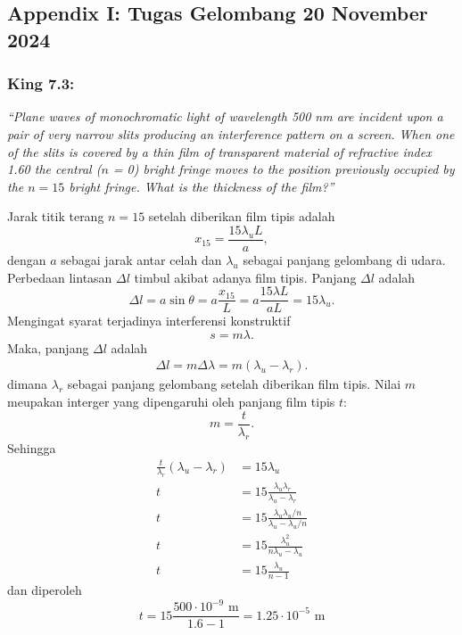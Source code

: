 \documentclass[../../../main.tex]{subfiles}
\begin{document}
\subsection{Appendix I: Tugas Gelombang 20 November 2024}
\subsubsection{King 7.3:} \emph{\enquote{Plane waves of monochromatic light of wavelength 500 nm are incident upon a pair of very narrow slits producing an interference pattern on a screen. When one of the slits is covered by a thin ﬁlm of transparent material of refractive index 1.60 the central ($n$ = 0) bright fringe moves to the position previously occupied by the $n = 15$ bright fringe. What is the thickness of the ﬁlm?}}

Jarak titik terang $n=15$ setelah diberikan film tipis adalah
\begin{equation*}
  x_{15}=\frac{15\lambda_u L}{a},
\end{equation*}
dengan $a$ sebagai jarak antar celah dan $\lambda_u$ sebagai panjang gelombang di udara. Perbedaan lintasan $\Delta l$ timbul akibat adanya film tipis. Panjang $\Delta l$ adalah 
\begin{equation*}
  \Delta l=a\sin\theta=a\frac{x_{15}}{L}=a\frac{15\lambda L}{aL}=15\lambda_u.
\end{equation*}
Mengingat syarat terjadinya interferensi konstruktif 
\begin{equation*}
  s=m\lambda.
\end{equation*}
Maka, panjang $\Delta l$ adalah 
\begin{align*}
  \Delta l=m\Delta \lambda=m( \lambda_u-\lambda_r).
\end{align*}
dimana $\lambda_r$ sebagai panjang gelombang setelah diberikan film tipis. Nilai $m$ meupakan interger yang dipengaruhi oleh panjang film tipis $t$:
\begin{equation*}
  m=\frac{t}{\lambda_r}.
\end{equation*}
Sehingga
\begin{align*}
  \frac{t}{\lambda_r}( \lambda_u-\lambda_r)&=15\lambda_u\\
  t&=15\frac{\lambda_u\lambda_r}{ \lambda_u-\lambda_r}\\
  t&=15\frac{\lambda_u\lambda_u/n}{ \lambda_u-\lambda_u/n}\\
  t&=15\frac{\lambda_u^2}{ n\lambda_u-\lambda_u}\\
  t&=15\frac{\lambda_u}{ n-1}
\end{align*}
dan diperoleh 
\begin{equation*}
  t=15\frac{500\cdot10^{-9} \text{ m}}{ 1.6-1}=\boxed{1.25 \cdot 10^{-5} \text{ m}}
\end{equation*}
\end{document}

